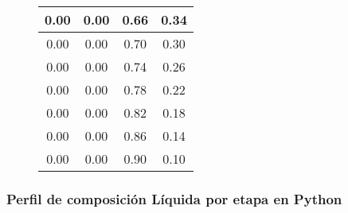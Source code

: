\begin{figure}[H]
\begin{tabular}{|c|c|c|c|}
        0.00           & 0.00             & 0.66              & 0.34               \\
        \hline
        0.00           & 0.00             & 0.70              & 0.30               \\
        \hline
        0.00           & 0.00             & 0.74              & 0.26               \\
        \hline
        0.00           & 0.00             & 0.78              & 0.22               \\
        \hline
        0.00           & 0.00             & 0.82              & 0.18               \\
        \hline
        0.00           & 0.00             & 0.86              & 0.14               \\
        \hline
        0.00           & 0.00             & 0.90              & 0.10               \\
        \hline
    \end{tabular}
    \normalsize
\end{figure}

\newpage

\subsubsection{Perfil de composición Líquida por etapa en Python}

